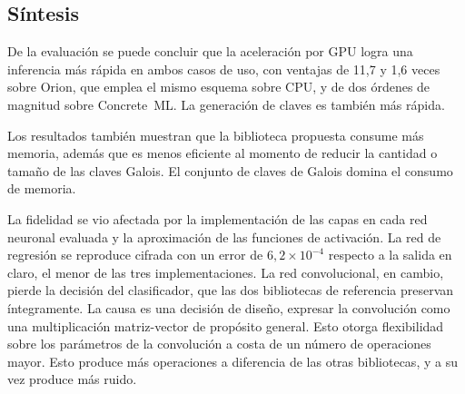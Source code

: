 \subsection{Síntesis}

De la evaluación se puede concluir que la aceleración por GPU logra una inferencia más rápida en ambos casos de uso, con ventajas de 11,7 y 1,6 veces sobre Orion, que emplea el mismo esquema sobre CPU, y de dos órdenes de magnitud sobre Concrete~ML. La generación de claves es también más rápida.

Los resultados también muestran que la biblioteca propuesta consume más memoria, además que es menos eficiente al momento de reducir la cantidad o tamaño de las claves Galois. El conjunto de claves de Galois domina el consumo de memoria.

La fidelidad se vio afectada por la implementación de las capas en cada red neuronal evaluada y la aproximación de las funciones de activación. La red de regresión se reproduce cifrada con un error de $6{,}2 \times 10^{-4}$ respecto a la salida en claro, el menor de las tres implementaciones. La red convolucional, en cambio, pierde la decisión del clasificador, que las dos bibliotecas de referencia preservan íntegramente. La causa es una decisión de diseño, expresar la convolución como una multiplicación matriz-vector de propósito general. Esto otorga flexibilidad sobre los parámetros de la convolución a costa de un número de operaciones mayor. Esto produce más operaciones a diferencia de las otras bibliotecas, y a su vez produce más ruido. 
